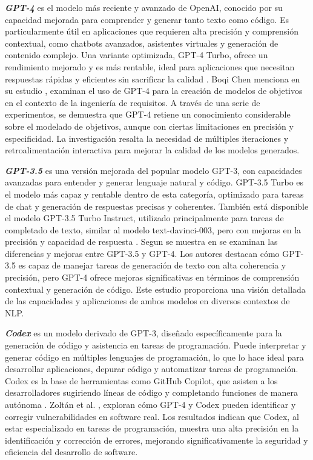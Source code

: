 \textit{\textbf{GPT-4}} es el modelo más reciente y avanzado de OpenAI, conocido por su capacidad mejorada para comprender y generar tanto texto como código. Es particularmente útil en aplicaciones que requieren alta precisión y comprensión contextual, como chatbots avanzados, asistentes virtuales y generación de contenido complejo. Una variante optimizada, GPT-4 Turbo, ofrece un rendimiento mejorado y es más rentable, ideal para aplicaciones que necesitan respuestas rápidas y eficientes sin sacrificar la calidad \cite{Elon2024}. Boqi Chen menciona en su estudio \cite{Chen2023}, examinan el uso de GPT-4 para la creación de modelos de objetivos en el contexto de la ingeniería de requisitos. A través de una serie de experimentos, se demuestra que GPT-4 retiene un conocimiento considerable sobre el modelado de objetivos, aunque con ciertas limitaciones en precisión y especificidad. La investigación resalta la necesidad de múltiples iteraciones y retroalimentación interactiva para mejorar la calidad de los modelos generados.

\textbf{\textit{GPT-3.5}} es una versión mejorada del popular modelo GPT-3, con capacidades avanzadas para entender y generar lenguaje natural y código. GPT-3.5 Turbo es el modelo más capaz y rentable dentro de esta categoría, optimizado para tareas de chat y generación de respuestas precisas y coherentes. También está disponible el modelo GPT-3.5 Turbo Instruct, utilizado principalmente para tareas de completado de texto, similar al modelo text-davinci-003, pero con mejoras en la precisión y capacidad de respuesta \cite{Elon2024}. Segun se muestra en \cite{Lucke2024} se examinan las diferencias y mejoras entre GPT-3.5 y GPT-4. Los autores destacan cómo GPT-3.5 es capaz de manejar tareas de generación de texto con alta coherencia y precisión, pero GPT-4 ofrece mejoras significativas en términos de comprensión contextual y generación de código. Este estudio proporciona una visión detallada de las capacidades y aplicaciones de ambos modelos en diversos contextos de NLP.

\textbf{\textit{Codex}} es un modelo derivado de GPT-3, diseñado específicamente para la generación de código y asistencia en tareas de programación. Puede interpretar y generar código en múltiples lenguajes de programación, lo que lo hace ideal para desarrollar aplicaciones, depurar código y automatizar tareas de programación. Codex es la base de herramientas como GitHub Copilot, que asisten a los desarrolladores sugiriendo líneas de código y completando funciones de manera autónoma \cite{Elon2024}. Zoltán et al. \cite{Sagodi2024}, exploran cómo GPT-4 y Codex pueden identificar y corregir vulnerabilidades en software real. Los resultados indican que Codex, al estar especializado en tareas de programación, muestra una alta precisión en la identificación y corrección de errores, mejorando significativamente la seguridad y eficiencia del desarrollo de software.

